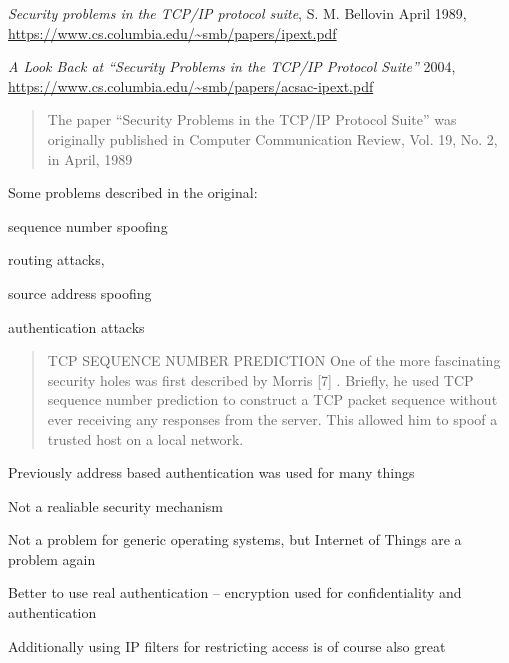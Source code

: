 \documentclass[Screen16to9,17pt]{foils}
\begin{document}


\begin{quote}

\end{quote}

\begin{list2}
\item
\emph{Security problems in the TCP/IP protocol suite}, S. M. Bellovin April 1989,\\
 \url{https://www.cs.columbia.edu/~smb/papers/ipext.pdf}
\item \emph{A Look Back at “Security Problems in the TCP/IP Protocol Suite”} 2004,\\
 \url{https://www.cs.columbia.edu/~smb/papers/acsac-ipext.pdf}
\end{list2}



\begin{quote}
The paper “Security Problems in the TCP/IP Protocol Suite” was originally published in Computer Communication Review, Vol. 19, No. 2, in April, 1989
\end{quote}

\begin{list1}
\item Some problems described in the original:
\item sequence number spoofing
\item routing attacks,
\item source address spoofing
\item authentication attacks
\end{list1}


\vskip 5mm
\begin{quote}
TCP SEQUENCE NUMBER PREDICTION
One of the more fascinating security holes was first described by Morris [7] . Briefly, he used TCP
sequence number prediction to construct a TCP packet sequence without ever receiving any responses
from the server. This allowed him to spoof a trusted host on a local network.
\end{quote}

\begin{list1}
\item Previously address based authentication was used for many things
\item Not a realiable security mechanism
\item Not a problem for generic operating systems, but Internet of Things are a problem again
\item Better to use real authentication -- encryption used for confidentiality and authentication
\item Additionally using IP filters for restricting access is of course also great
\end{list1}
\end{document}
